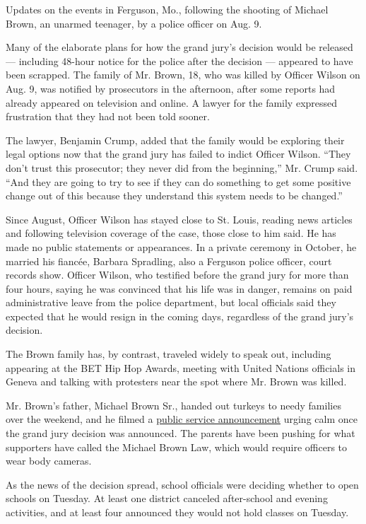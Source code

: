 Updates on the events in Ferguson, Mo., following the shooting of
Michael Brown, an unarmed teenager, by a police officer on Aug. 9.

Many of the elaborate plans for how the grand jury's decision would be
released --- including 48-hour notice for the police after the decision
--- appeared to have been scrapped. The family of Mr. Brown, 18, who was
killed by Officer Wilson on Aug. 9, was notified by prosecutors in the
afternoon, after some reports had already appeared on television and
online. A lawyer for the family expressed frustration that they had not
been told sooner.

The lawyer, Benjamin Crump, added that the family would be exploring
their legal options now that the grand jury has failed to indict Officer
Wilson. ``They don't trust this prosecutor; they never did from the
beginning,'' Mr. Crump said. ``And they are going to try to see if they
can do something to get some positive change out of this because they
understand this system needs to be changed.''

Since August, Officer Wilson has stayed close to St. Louis, reading news
articles and following television coverage of the case, those close to
him said. He has made no public statements or appearances. In a private
ceremony in October, he married his fiancée, Barbara Spradling, also a
Ferguson police officer, court records show. Officer Wilson, who
testified before the grand jury for more than four hours, saying he was
convinced that his life was in danger, remains on paid administrative
leave from the police department, but local officials said they expected
that he would resign in the coming days, regardless of the grand jury's
decision.

The Brown family has, by contrast, traveled widely to speak out,
including appearing at the BET Hip Hop Awards, meeting with United
Nations officials in Geneva and talking with protesters near the spot
where Mr. Brown was killed.

Mr. Brown's father, Michael Brown Sr., handed out turkeys to needy
families over the weekend, and he filmed a
\href{https://www.youtube.com/watch?v=x4LkX7PZCoo}{public service
announcement} urging calm once the grand jury decision was announced.
The parents have been pushing for what supporters have called the
Michael Brown Law, which would require officers to wear body cameras.

As the news of the decision spread, school officials were deciding
whether to open schools on Tuesday. At least one district canceled
after-school and evening activities, and at least four announced they
would not hold classes on Tuesday.

